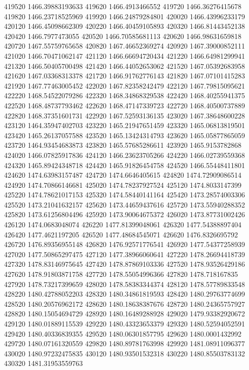 {419520 1466.39883193633
419620 1466.4913466552
419720 1466.36276415678
419820 1466.23718525969
419920 1466.24879284801
420020 1466.43996233179
420120 1466.45098662309
420220 1466.40459105893
420320 1466.81443452138
420420 1466.7977473055
420520 1466.70585681113
420620 1466.98631659818
420720 1467.55759765658
420820 1467.46652369274
420920 1467.39000852111
421020 1466.70471062147
421120 1466.66694720434
421220 1466.64981299941
421320 1466.50405700498
421420 1466.44052653062
421520 1467.05392683958
421620 1467.03368313378
421720 1466.91762776143
421820 1467.07101415283
421920 1467.77463005452
422020 1467.82358242479
422120 1467.79815095621
422220 1468.54522079286
422320 1468.34868329538
422420 1468.40255941375
422520 1468.48737793462
422620 1468.47147339723
422720 1468.40500737889
422820 1468.37351601731
422920 1467.52593136135
423020 1467.38648600228
423120 1464.35947402703
423220 1465.21947651459
423320 1465.06813819501
423420 1465.26137057588
423520 1465.13424314793
423620 1465.05877865059
423720 1464.93454683873
423820 1465.57685286611
423920 1465.9153782868
424020 1466.07825917836
424120 1466.23623705266
424220 1466.02739559368
424320 1465.89424348718
424420 1465.91826454758
424520 1466.55448411801
424620 1474.63983157487
424720 1474.6646405615
424820 1474.72909086514
424920 1474.70866146681
425020 1474.78237927524
425120 1474.8033147399
425220 1474.78621017153
425320 1474.58440141164
425420 1473.28574003306
425520 1473.21041632157
425620 1473.44659437616
425720 1473.55940288352
425820 1473.61256804496
425920 1473.90064675372
426020 1473.87731002426
426120 1474.0683048074
426220 1477.81399048061
426320 1477.54388897404
426420 1477.4621197205
426520 1477.48684545071
426620 1476.8326695792
426720 1476.89356955148
426820 1476.92571776541
426920 1477.54377258939
427020 1477.50865297475
427120 1477.38966060641
427220 1478.26694418739
427320 1478.83146975645
427420 1478.87869103336
427520 1478.93526429186
427620 1478.91803871758
427720 1478.55054996366
427820 1478.718167835
427920 1478.73217399659
428020 1478.58383344374
428120 1478.57789833548
428220 1480.42788052203
428320 1480.34861819593
428420 1480.29763774699
428520 1480.20576962172
428620 1480.18638387676
428720 1480.24365757927
428820 1480.15054694729
428920 1480.16489288928
429020 1479.93382920672
429120 1480.01889115539
429220 1480.43323653379
429320 1480.52594052591
429420 1480.40336839355
429520 1480.06301857795
429620 1480.0001432992
429720 1480.07161320559
429820 1480.89781763998
429920 1481.08911096377
430020 1480.97232475835
430120 1480.93501532318
430220 1480.85503783132
430320 1481.31953559763
}
